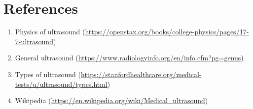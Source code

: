 \documentclass[12pt]{book}
\begin{document}
\section*{References}
\begin{enumerate}
\item  Physics of ultrasound (\url{https://openstax.org/books/college-physics/pages/17-7-ultrasound})
\item General ultrasound (\url{https://www.radiologyinfo.org/en/info.cfm?pg=genus})
\item Types of ultrasound (\url{https://stanfordhealthcare.org/medical-tests/u/ultrasound/types.html})
\item Wikipedia (\url{https://en.wikipedia.org/wiki/Medical_ultrasound})
\end{enumerate}
\end{document}
